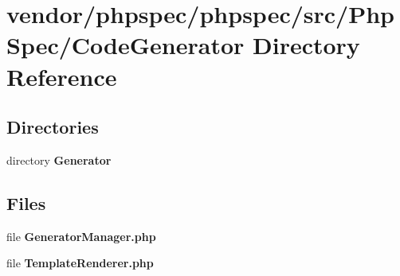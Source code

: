\section{vendor/phpspec/phpspec/src/\+Php\+Spec/\+Code\+Generator Directory Reference}
\label{dir_f04ebf40eec23662d879805035a62547}
\subsection*{Directories}
\begin{DoxyCompactItemize}
\item 
directory {\bf Generator}
\end{DoxyCompactItemize}
\subsection*{Files}
\begin{DoxyCompactItemize}
\item 
file {\bf Generator\+Manager.\+php}
\item 
file {\bf Template\+Renderer.\+php}
\end{DoxyCompactItemize}
